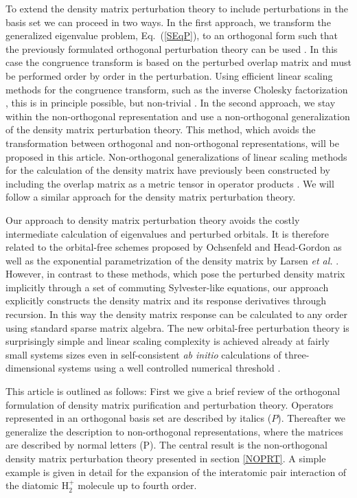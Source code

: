 \documentclass[twocolumn,showpacs,preprintnumbers,amsmath,amssymb]{revtex4}
\begin{document}
To extend the density matrix perturbation theory to include perturbations in the basis
set we can proceed in two ways. In the first approach, 
we transform the generalized eigenvalue problem, Eq.\ (\ref{SEqP}), to an orthogonal form such
that the previously formulated orthogonal perturbation theory can be used  \cite{NiklassonPRT1,WeberPRT2}. 
In this case the congruence transform is based on the perturbed overlap matrix and must be performed
order by order in the perturbation. Using efficient linear scaling methods for the
congruence transform, such as the inverse Cholesky factorization \cite{Benzi96,Challa99}, 
this is in principle possible, but non-trivial \cite{Niklasson_Unpubl}.
In the second approach, we stay within the non-orthogonal representation and use
a non-orthogonal generalization of the density matrix perturbation theory. This method,
which avoids the transformation between orthogonal and non-orthogonal representations,
will be proposed in this article.  
Non-orthogonal generalizations of linear scaling methods for the calculation
of the density matrix have previously been constructed by including the overlap matrix 
as a metric tensor in operator products \cite{Nunes94,White97,Palser98}.
We will follow a similar approach for the density matrix perturbation theory.

Our approach to density matrix perturbation theory avoids the costly intermediate calculation
of eigenvalues and perturbed orbitals. It is therefore related
to the orbital-free schemes proposed by Ochsenfeld and Head-Gordon \cite{Ochsenfeld97,Ochsenfeld04} as
well as the exponential parametrization of the density matrix by Larsen {\em et al.} \cite{Larsen01}.
However, in contrast to these methods, which pose the perturbed density matrix
implicitly through a set of commuting Sylvester-like equations, our approach explicitly constructs
the density matrix and its response derivatives through recursion. In this way the density matrix 
response can be calculated to any order using standard sparse matrix algebra.
The new orbital-free perturbation theory is surprisingly simple and linear scaling complexity is achieved
already at fairly small systems sizes even in self-consistent {\em ab initio} calculations of
three-dimensional systems using a well controlled numerical threshold \cite{WeberPRT2}.

This article is outlined as follows: First we give a brief review of the orthogonal 
formulation of density matrix purification and perturbation theory. 
Operators represented in an orthogonal basis set are described by italics ($P$). 
Thereafter we generalize the description to non-orthogonal representations, where 
the matrices are described by normal letters (P). The central result is the non-orthogonal
density matrix perturbation theory presented in section \ref{NOPRT}.
A simple example is given in detail for the expansion of the interatomic pair 
interaction of the diatomic H$_2^+$ molecule up to fourth order.
\end{document}
